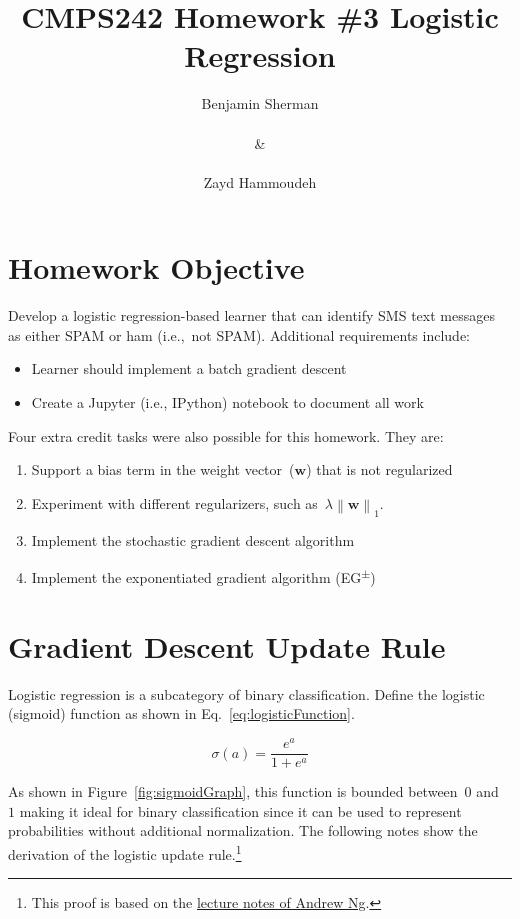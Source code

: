 \documentclass{report}
\title{\textbf{CMPS242 Homework \#3 \textendash{} Logistic Regression}}
\author{Benjamin Sherman \\~\\ \& \\~\\ Zayd Hammoudeh}
\newcommand{\norm}[1]{\left\lVert#1\right\rVert}
\newcommand{\w}{\mathbf{w}}
\begin{document}
  \maketitle
  
  \suppressfloats
  \section{Homework Objective}
  
  Develop a logistic regression-based learner that can identify SMS text messages as either SPAM or ham (i.e.,~not SPAM).  Additional requirements include:
  
  \begin{itemize}
    \setlength\itemsep{0pt}
    \item Learner should implement a batch gradient descent
    \item Create a Jupyter (i.e., IPython) notebook to document all work
  \end{itemize}

  \noindent
  Four extra credit tasks were also possible for this homework.  They are:
  
  \begin{enumerate}
    \setlength\itemsep{0pt}
    \item Support a bias term in the weight vector~($\mathbf{w}$) that is not regularized
    \item Experiment with different regularizers, such as~$\lambda\norm{\w}_1$.
    \item Implement the stochastic gradient descent algorithm
    \item Implement the exponentiated gradient algorithm (EG\textsuperscript{$\pm$})
  \end{enumerate}
 
  \section{Gradient Descent Update Rule}
  
  Logistic regression is a subcategory of binary classification.  Define the logistic (sigmoid) function as shown in Eq.~\eqref{eq:logisticFunction}.
  
  \begin{equation}
    \sigma(a) = \frac{e^{a}}{1+e^{a}}\label{eq:logisticFunction}
  \end{equation}
  
  \noindent
  As shown in Figure~\ref{fig:sigmoidGraph}, this function is bounded between~$0$ and~$1$ making it ideal for binary classification since it can be used to represent probabilities without additional normalization. The following notes show the derivation of the logistic update rule.\footnote{This proof is based on the \href{http://cs229.stanford.edu/notes/cs229-notes1.pdf}{lecture notes of Andrew Ng}.}
  
\end{document}
